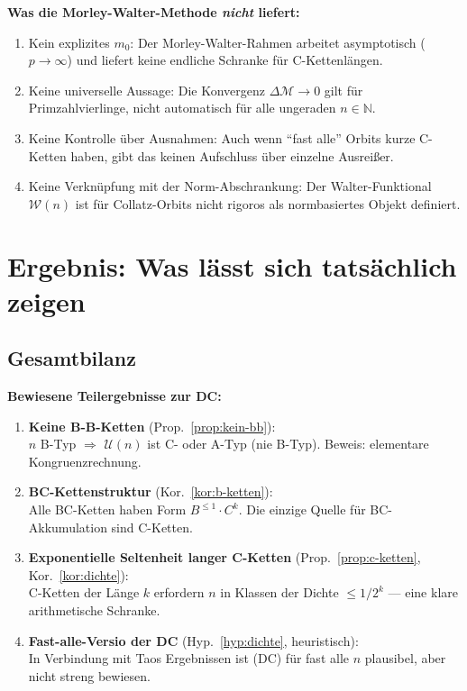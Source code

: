 \documentclass[12pt,a4paper]{article}
\newcommand{\U}{\mathcal{U}}
\newcommand{\N}{\mathbb{N}}
\newcommand{\Mcal}{\mathcal{M}}      %
\newcommand{\Wcal}{\mathcal{W}}      %
\begin{document}
\begin{tcolorbox}[lücke]
\textbf{Was die Morley-Walter-Methode \emph{nicht} liefert:}
\begin{enumerate}[label=(\arabic*)]
  \item Kein explizites $m_0$: Der Morley-Walter-Rahmen arbeitet
    asymptotisch ($p \to \infty$) und liefert keine endliche Schranke
    für C-Kettenlängen.
  \item Keine universelle Aussage: Die Konvergenz $\Delta\Mcal \to 0$
    gilt für Primzahlvierlinge, nicht automatisch für alle
    ungeraden $n \in \N$.
  \item Keine Kontrolle über Ausnahmen: Auch wenn ``fast alle''
    Orbits kurze C-Ketten haben, gibt das keinen Aufschluss
    über einzelne Ausreißer.
  \item Keine Verknüpfung mit der Norm-Abschrankung:
    Der Walter-Funktional $\Wcal(n)$ ist für Collatz-Orbits
    nicht rigoros als normbasiertes Objekt definiert.
\end{enumerate}
\end{tcolorbox}

\section{Ergebnis: Was lässt sich tatsächlich zeigen}

\subsection{Gesamtbilanz}

\begin{tcolorbox}[ergebnis]
\textbf{Bewiesene Teilergebnisse zur DC:}
\begin{enumerate}[label=(\arabic*)]
  \item \textbf{Keine B-B-Ketten} (Prop.~\ref{prop:kein-bb}): \\
    $n$ B-Typ $\Rightarrow$ $\U(n)$ ist C- oder A-Typ (nie B-Typ).
    Beweis: elementare Kongruenzrechnung.

  \item \textbf{BC-Kettenstruktur} (Kor.~\ref{kor:b-ketten}): \\
    Alle BC-Ketten haben Form $B^{\leq 1} \cdot C^k$.
    Die einzige Quelle für BC-Akkumulation sind C-Ketten.

  \item \textbf{Exponentielle Seltenheit langer C-Ketten}
    (Prop.~\ref{prop:c-ketten}, Kor.~\ref{kor:dichte}): \\
    C-Ketten der Länge $k$ erfordern $n$ in Klassen der Dichte
    $\leq 1/2^k$ — eine klare arithmetische Schranke.

  \item \textbf{Fast-alle-Versio der DC}
    (Hyp.~\ref{hyp:dichte}, heuristisch): \\
    In Verbindung mit Taos Ergebnissen ist (DC) für fast alle $n$
    plausibel, aber nicht streng bewiesen.
\end{enumerate}
\end{tcolorbox}
\end{document}
